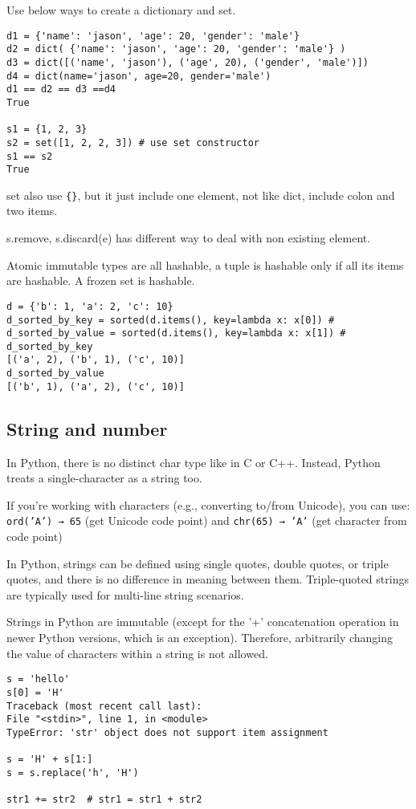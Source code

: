 \documentclass[a4paper,12pt,twoside]{book}
\begin{document}
Use below ways to create a dictionary and set. 
\begin{lstlisting}
d1 = {'name': 'jason', 'age': 20, 'gender': 'male'}
d2 = dict( {'name': 'jason', 'age': 20, 'gender': 'male'} )
d3 = dict([('name', 'jason'), ('age', 20), ('gender', 'male')])
d4 = dict(name='jason', age=20, gender='male') 
d1 == d2 == d3 ==d4
True

s1 = {1, 2, 3}
s2 = set([1, 2, 2, 3]) # use set constructor
s1 == s2
True
\end{lstlisting}

	set also use \verb|{}|, but it just include one element, not like dict, include colon and two items. 
	
	s.remove, s.discard(e) has different way to deal with non existing element. 


Atomic immutable types are all hashable, a tuple is hashable only if all its items are hashable. A frozen set is hashable. 

\begin{lstlisting}
d = {'b': 1, 'a': 2, 'c': 10}
d_sorted_by_key = sorted(d.items(), key=lambda x: x[0]) # 
d_sorted_by_value = sorted(d.items(), key=lambda x: x[1]) # 
d_sorted_by_key
[('a', 2), ('b', 1), ('c', 10)]
d_sorted_by_value
[('b', 1), ('a', 2), ('c', 10)]
\end{lstlisting}

\subsection{String and number}

In Python, there is no distinct char type like in C or C++. Instead, Python treats a single-character as a string too.

If you're working with characters (e.g., converting to/from Unicode), you can use: \texttt{ord('A') → 65} (get Unicode code point) and \texttt{chr(65) → 'A'} (get character from code point)

In Python, strings can be defined using single quotes, double quotes, or triple quotes, and there is no difference in meaning between them. Triple-quoted strings are typically used for multi-line string scenarios. 

Strings in Python are immutable (except for the '+' concatenation operation in newer Python versions, which is an exception). Therefore, arbitrarily changing the value of characters within a string is not allowed. 
\begin{lstlisting}
s = 'hello'
s[0] = 'H'
Traceback (most recent call last):
File "<stdin>", line 1, in <module>
TypeError: 'str' object does not support item assignment

s = 'H' + s[1:]
s = s.replace('h', 'H')

str1 += str2  # str1 = str1 + str2
\end{lstlisting}
\end{document}

